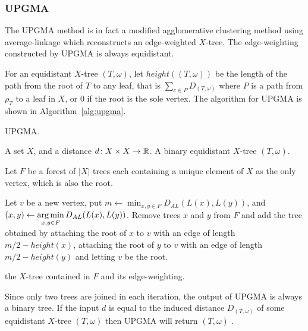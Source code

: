 \subsubsection{UPGMA}
\label{sec:upgma}

The UPGMA method is in fact a modified agglomerative clustering method using
average-linkage which reconstructs an edge-weighted $X$-tree.  The
edge-weighting constructed by UPGMA is always equidistant.

For an equidistant $X$-tree $(T,\omega)$, let $height((T,\omega))$ be the
length of the path from the root of $T$ to any leaf, that is $\sum_{e \in P}
D_{(T,\omega)}$ where $P$ is a path from $\rho_T$ to a leaf in $X$, or 0 if
the root is the sole vertex.  The algorithm for UPGMA is shown in
Algorithm~\ref{alg:upgma}.

\begin{algorithm}[h]
  \caption{UPGMA.}
  \label{alg:upgma}

  \begin{algorithmic}
    \Require A set $X$, and a distance $d \colon X \times X \to {\mathbb R}$.
    \Ensure  A binary equidistant $X$-tree $(T, \omega)$.

    \State Let $F$ be a forest of $|X|$ trees each containing a unique element
    of $X$ as the only vertex, which is also the root.


       \State Let $v$ be a new vertex,
       \State put $\displaystyle m \gets \min_{x,y \in F} D_{AL}(L(x),L(y))$,
       \State and $\displaystyle (x,y) \gets \operatorname*{arg\,min}_{x,y \in F} D_{AL}(L(x),L(y))$.
       \State Remove trees $x$ and $y$ from $F$ and add the tree obtained by
         attaching the root of $x$ to $v$ with an edge of length $m/2 -
         height(x)$, attaching the root of $y$ to $v$ with an edge of length
         $m/2 - height(y)$ and letting $v$ be the root.
    
    \EndWhile

    \State \Return the $X$-tree contained in $F$ and its edge-weighting.
  \end{algorithmic}
\end{algorithm}

Since only two trees are joined in each iteration, the output of UPGMA is
always a binary tree.  If the input $d$ is equal to the induced distance
$D_{(T,\omega)}$ of some equidistant $X$-tree $(T,\omega)$ then UPGMA will
return $(T,\omega)$ \cite{durbin1998biological}.


